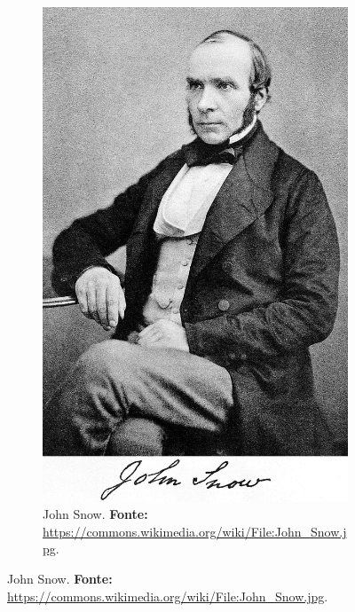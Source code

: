 \begin{figure}[!htp]
\begin{footnotesize}
\begin{subfigure}[b]{0.4\linewidth}
		\includegraphics[width=1\textwidth]{2-cap1/complementos/fotos/John_Snow.jpg} 
		\caption{John Snow. \textbf{Fonte:} \url{https://commons.wikimedia.org/wiki/File:John_Snow.jpg}.}
		\label{fig:johnsnow}
	\end{subfigure}


\end{footnotesize}
\end{figure}
